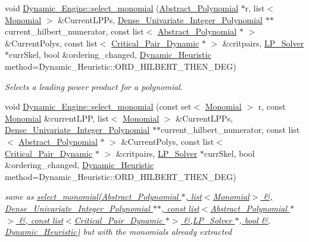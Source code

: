 \begin{DoxyCompactItemize}
void \hyperlink{group___g_b_computation_gaa01d88c431b84deabf51ee116d7d2a0e}{Dynamic\+\_\+\+Engine\+::select\+\_\+monomial} (\hyperlink{group__polygroup_class_abstract___polynomial}{Abstract\+\_\+\+Polynomial} $\ast$r, list$<$ \hyperlink{group__polygroup_class_monomial}{Monomial} $>$ \&Current\+L\+P\+Ps, \hyperlink{group__polygroup_class_dense___univariate___integer___polynomial}{Dense\+\_\+\+Univariate\+\_\+\+Integer\+\_\+\+Polynomial} $\ast$$\ast$current\+\_\+hilbert\+\_\+numerator, const list$<$ \hyperlink{group__polygroup_class_abstract___polynomial}{Abstract\+\_\+\+Polynomial} $\ast$ $>$ \&Current\+Polys, const list$<$ \hyperlink{group___g_b_computation_class_critical___pair___dynamic}{Critical\+\_\+\+Pair\+\_\+\+Dynamic} $\ast$ $>$ \&critpairs, \hyperlink{group___c_l_s_solvers_class_l_p___solvers_1_1_l_p___solver}{L\+P\+\_\+\+Solver} $\ast$curr\+Skel, bool \&ordering\+\_\+changed, \hyperlink{group___g_b_computation_ga819b1fd40d9a40ff303df3b90647ecb0}{Dynamic\+\_\+\+Heuristic} method=Dynamic\+\_\+\+Heuristic\+::\+O\+R\+D\+\_\+\+H\+I\+L\+B\+E\+R\+T\+\_\+\+T\+H\+E\+N\+\_\+\+D\+EG)
\begin{DoxyCompactList}\small\item\em Selects a leading power product for a polynomial. \end{DoxyCompactList}\item 
void \hyperlink{group___g_b_computation_ga8b938265dccdb6d410ed2906de4ed5e5}{Dynamic\+\_\+\+Engine\+::select\+\_\+monomial} (const set$<$ \hyperlink{group__polygroup_class_monomial}{Monomial} $>$ r, const \hyperlink{group__polygroup_class_monomial}{Monomial} \&current\+L\+PP, list$<$ \hyperlink{group__polygroup_class_monomial}{Monomial} $>$ \&Current\+L\+P\+Ps, \hyperlink{group__polygroup_class_dense___univariate___integer___polynomial}{Dense\+\_\+\+Univariate\+\_\+\+Integer\+\_\+\+Polynomial} $\ast$$\ast$current\+\_\+hilbert\+\_\+numerator, const list$<$ \hyperlink{group__polygroup_class_abstract___polynomial}{Abstract\+\_\+\+Polynomial} $\ast$ $>$ \&Current\+Polys, const list$<$ \hyperlink{group___g_b_computation_class_critical___pair___dynamic}{Critical\+\_\+\+Pair\+\_\+\+Dynamic} $\ast$ $>$ \&critpairs, \hyperlink{group___c_l_s_solvers_class_l_p___solvers_1_1_l_p___solver}{L\+P\+\_\+\+Solver} $\ast$curr\+Skel, bool \&ordering\+\_\+changed, \hyperlink{group___g_b_computation_ga819b1fd40d9a40ff303df3b90647ecb0}{Dynamic\+\_\+\+Heuristic} method=Dynamic\+\_\+\+Heuristic\+::\+O\+R\+D\+\_\+\+H\+I\+L\+B\+E\+R\+T\+\_\+\+T\+H\+E\+N\+\_\+\+D\+EG)
\begin{DoxyCompactList}\small\item\em same as {\ttfamily \hyperlink{group___g_b_computation_gaa01d88c431b84deabf51ee116d7d2a0e}{select\+\_\+monomial(\+Abstract\+\_\+\+Polynomial $\ast$, list$<$\+Monomial$>$ \&, Dense\+\_\+\+Univariate\+\_\+\+Integer\+\_\+\+Polynomial $\ast$$\ast$, const list$<$\+Abstract\+\_\+\+Polynomial $\ast$$>$ \&, const list$<$\+Critical\+\_\+\+Pair\+\_\+\+Dynamic $\ast$$>$ \&,\+L\+P\+\_\+\+Solver $\ast$, bool \&, Dynamic\+\_\+\+Heuristic)}} but with the monomials already extracted \end{DoxyCompactList}\item 

\end{DoxyCompactItemize}
